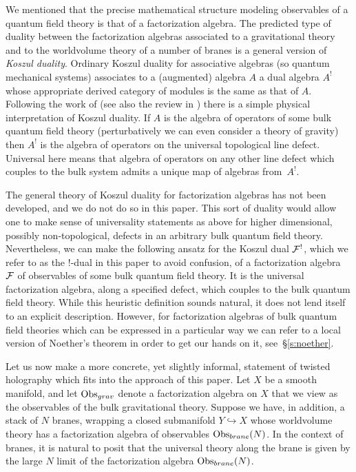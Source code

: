 \documentclass[11pt]{amsart}
\begin{document}
We mentioned that the precise mathematical structure modeling observables of a quantum field theory is that of a factorization algebra.
The predicted type of duality between the factorization algebras associated to a gravitational theory and to the worldvolume theory of a number of branes is a general version of \textit{Koszul duality}.
Ordinary Koszul duality for associative algebras (so quantum mechanical systems) associates to a (augmented) algebra $A$ a dual algebra $A^!$ whose appropriate derived category of modules is the same as that of $A$. 
Following the work of \cite{CLsugra,CP1} (see also the review in \cite{PWkoszul}) there is a simple physical interpretation of Koszul duality.
If $A$ is the algebra of operators of some bulk quantum field theory (perturbatively we can even consider a theory of gravity) then $A^!$ is the algebra of operators on the universal topological line defect.
Universal here means that algebra of operators on any other line defect which couples to the bulk system admits a unique map of algebras from~$A^!$. 

The general theory of Koszul duality for factorization algebras has not been developed, and we do not do so in this paper.
This sort of duality would allow one to make sense of universality statements as above for higher dimensional, possibly non-topological, defects in an arbitrary bulk quantum field theory.
Nevertheless, we can make the following ansatz for the Koszul dual $\mathcal F^!$, which we refer to as the $!$-dual in this paper to avoid confusion, of a factorization algebra~$\mathcal F$ of observables of some bulk quantum field theory.
It is the universal factorization algebra, along a specified defect, which couples to the bulk quantum field theory.
While this heuristic definition sounds natural, it does not lend itself to an explicit description.
However, for factorization algebras of bulk quantum field theories which can be expressed in a particular way we can refer to a local version of Noether's theorem in order to get our hands on it, see~\S\ref{s:noether}.

Let us now make a more concrete, yet slightly informal, statement of twisted holography which fits into the approach of this paper.
Let $X$ be a smooth manifold, and let $\operatorname{Obs}_{grav}$ denote a factorization algebra on $X$ that we view as the observables of the bulk gravitational theory. 
Suppose we have, in addition, a stack of $N$ branes, wrapping a closed submanifold $Y\hookrightarrow X$ whose worldvolume theory has a factorization algebra of observables $\operatorname{Obs}_{brane}(N)$.
In the context of branes, it is natural to posit that the universal theory along the brane is given by the large $N$ limit of the factorization algebra $\operatorname{Obs}_{brane}(N)$.
\end{document}
